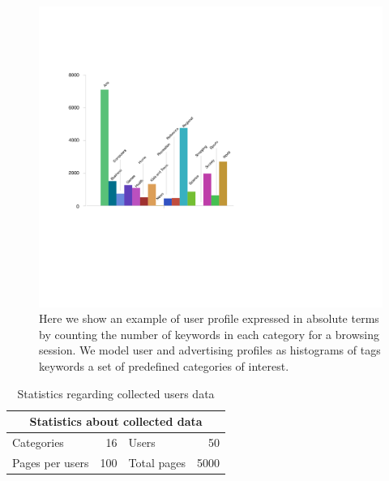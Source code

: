 \begin{figure}  
\includegraphics[width=\textwidth]{figures/absolute-population-profile-eps-converted-to.pdf}
\caption[A user's profile]{Here we show an example of user profile expressed in absolute terms by counting the number of keywords in each category for a browsing session. We model user and advertising profiles as histograms of tags keywords a set of predefined categories of interest.
\label{fig:abs-profile}}
\end{figure}

\begin{table}[htbp]
\centering
\caption{Statistics regarding collected users data \label{table:DatasetStat}}
\def\arraystretch{2.5}
\begin{tabular}{| l | r | l | r | }
\hline
\multicolumn{4}{|c|}{Statistics about collected data}            \\[2.5mm] \hline
Categories               & 16    & Users                   & 50   \\[2.5mm] \hline
Pages per users    & 100 & Total pages      & 5000 \\[2.5mm] \hline
\end{tabular}
\end{table}

